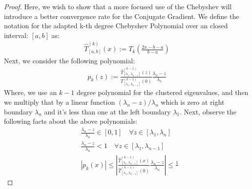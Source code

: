 \documentclass[]{article}
\theoremstyle{definition}
\begin{document}
            \begin{proof}
                Here, we wish to show that a more focused use of the Chebyshev will introduce a better convergence rate for the Conjugate Gradient. We define the notation for the adapted k-th degree Chebyshev Polynomial over an closed interval: $[a, b]$ as: 
                \begin{align}
                    \hat{T}_{[a, b]}^{(k)}(x) := 
                    T_k\left(
                        \frac{2x - b - a}{b - a}
                    \right)
                \end{align} 
                Next, we consider the following polynomial: 
                \begin{align}
                    p_k(z) := 
                    \frac
                    {
                        \hat{T}_{[\lambda_1, \lambda_{n - 1}]}^{(k - 1)}
                        \left(
                            z
                        \right)
                    }{
                        T^{(k - 1)}_{[\lambda_1, \lambda_{n - 1}]}
                        \left(
                            0
                        \right)
                    }\frac{\lambda_n - z}{\lambda_n}
                \end{align}
                Where, we use an $k-1$ degree polynomial for the clustered eigenvalues, and then we multiply that by a linear function $(\lambda_n - z)/\lambda_n$ which is zero at right boundary $\lambda_n$ and it's less than one at the left boundary $\lambda_1$. Next, observe the following facts about the above polynomials: 
                \begin{align}
                    &
                    \frac{\lambda_n - z}{\lambda_n} \in [0, 1]
                    \quad \forall z \in [\lambda_1, \lambda_n]
                    \\
                    &
                    \frac{\lambda_n - z}{\lambda_n} <1
                    \quad  \forall z \in 
                    [\lambda_1, \lambda_{n-1}]
                    \\
                    & 
                    |p_k(x)| \le
                    \left|
                        \frac{
                            \hat{T}_{[\lambda_1, \lambda_{n-1}]}^{(k - 1)}(x)
                        }{
                            \hat{T}_{[\lambda_1, \lambda_{n - 1}]}^{(k - 1)}(0)
                        }
                        \frac{\lambda_n - z}{\lambda_n}
                    \right|
                    \le 
                    \frac{1}{
}
\end{align}
\end{proof}
\end{document}

